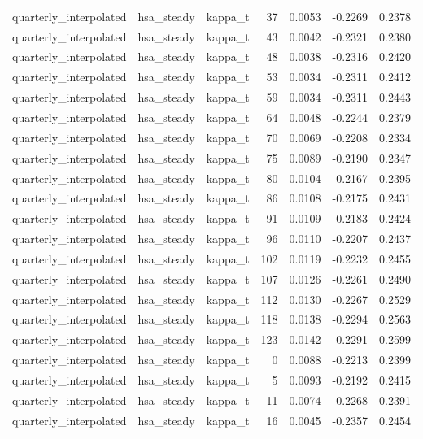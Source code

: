 \begin{tabular}{lllrrrr}
quarterly\_interpolated & hsa\_steady & kappa\_t & 37 & 0.0053 & -0.2269 & 0.2378 \\
quarterly\_interpolated & hsa\_steady & kappa\_t & 43 & 0.0042 & -0.2321 & 0.2380 \\
quarterly\_interpolated & hsa\_steady & kappa\_t & 48 & 0.0038 & -0.2316 & 0.2420 \\
quarterly\_interpolated & hsa\_steady & kappa\_t & 53 & 0.0034 & -0.2311 & 0.2412 \\
quarterly\_interpolated & hsa\_steady & kappa\_t & 59 & 0.0034 & -0.2311 & 0.2443 \\
quarterly\_interpolated & hsa\_steady & kappa\_t & 64 & 0.0048 & -0.2244 & 0.2379 \\
quarterly\_interpolated & hsa\_steady & kappa\_t & 70 & 0.0069 & -0.2208 & 0.2334 \\
quarterly\_interpolated & hsa\_steady & kappa\_t & 75 & 0.0089 & -0.2190 & 0.2347 \\
quarterly\_interpolated & hsa\_steady & kappa\_t & 80 & 0.0104 & -0.2167 & 0.2395 \\
quarterly\_interpolated & hsa\_steady & kappa\_t & 86 & 0.0108 & -0.2175 & 0.2431 \\
quarterly\_interpolated & hsa\_steady & kappa\_t & 91 & 0.0109 & -0.2183 & 0.2424 \\
quarterly\_interpolated & hsa\_steady & kappa\_t & 96 & 0.0110 & -0.2207 & 0.2437 \\
quarterly\_interpolated & hsa\_steady & kappa\_t & 102 & 0.0119 & -0.2232 & 0.2455 \\
quarterly\_interpolated & hsa\_steady & kappa\_t & 107 & 0.0126 & -0.2261 & 0.2490 \\
quarterly\_interpolated & hsa\_steady & kappa\_t & 112 & 0.0130 & -0.2267 & 0.2529 \\
quarterly\_interpolated & hsa\_steady & kappa\_t & 118 & 0.0138 & -0.2294 & 0.2563 \\
quarterly\_interpolated & hsa\_steady & kappa\_t & 123 & 0.0142 & -0.2291 & 0.2599 \\
quarterly\_interpolated & hsa\_steady & kappa\_t & 0 & 0.0088 & -0.2213 & 0.2399 \\
quarterly\_interpolated & hsa\_steady & kappa\_t & 5 & 0.0093 & -0.2192 & 0.2415 \\
quarterly\_interpolated & hsa\_steady & kappa\_t & 11 & 0.0074 & -0.2268 & 0.2391 \\
quarterly\_interpolated & hsa\_steady & kappa\_t & 16 & 0.0045 & -0.2357 & 0.2454 \\

\end{tabular}
